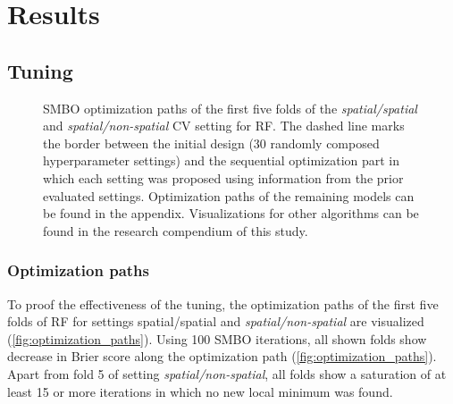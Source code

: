 \documentclass[review]{elsarticle}
\begin{document}
\section{Results}

\subsection{Tuning}

\begin{figure} [t!]
	\begin{center}
		\caption[]{SMBO optimization paths of the first five folds of the \emph{spatial/spatial} and \emph{spatial/non-spatial} CV setting for \ac{RF}. The dashed line marks the border between the initial design (30 randomly composed hyperparameter settings) and the sequential optimization part in which each setting was proposed using information from the prior evaluated settings. Optimization paths of the remaining models can be found in the appendix.
		Visualizations for other algorithms can be found in the research compendium of this study.}
		\label{fig:optimization_paths}
	\end{center}
\end{figure}

\subsubsection{Optimization paths}
To proof the effectiveness of the tuning, the optimization paths of the first five folds of RF for settings {spatial/spatial} and \emph{spatial/non-spatial} are visualized (\autoref{fig:optimization_paths}).
Using 100 SMBO iterations, all shown folds show decrease in Brier score along the optimization path (\autoref{fig:optimization_paths}).
Apart from fold 5 of setting \emph{spatial/non-spatial}, all folds show a saturation of at least 15 or more iterations in which no new local minimum was found.
\end{document}
